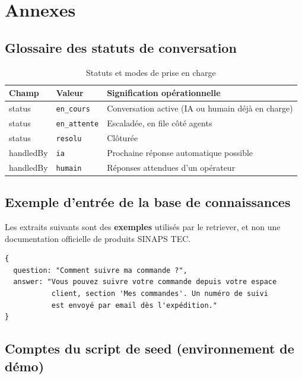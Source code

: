 \chapter{Annexes}

\section{Glossaire des statuts de conversation}

\begin{table}[H]
\centering
\caption{Statuts et modes de prise en charge}
\label{tab:annexe-statuts}
\begin{tabularx}{\textwidth}{|l|l|X|}
\hline
Champ & Valeur & Signification opérationnelle \\
\hline
status & \texttt{en\_cours} & Conversation active (IA ou humain déjà en charge) \\
\hline
status & \texttt{en\_attente} & Escaladée, en file côté agents \\
\hline
status & \texttt{resolu} & Clôturée \\
\hline
handledBy & \texttt{ia} & Prochaine réponse automatique possible \\
\hline
handledBy & \texttt{humain} & Réponses attendues d'un opérateur \\
\hline
\end{tabularx}
\end{table}

\section{Exemple d'entrée de la base de connaissances}

Les extraits suivants sont des \textbf{exemples} utilisés par le retriever, et non une documentation officielle de produits SINAPS TEC.

\begin{lstlisting}[caption={Extrait de \texttt{knowledgeBase.js}}]
{
  question: "Comment suivre ma commande ?",
  answer: "Vous pouvez suivre votre commande depuis votre espace
           client, section 'Mes commandes'. Un numéro de suivi
           est envoyé par email dès l'expédition."
}
\end{lstlisting}

\section{Comptes du script de seed (environnement de démo)}

